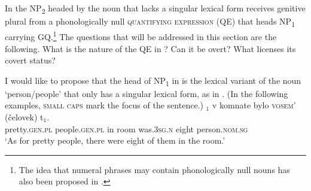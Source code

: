 \documentclass[output=paper,
modfonts,
newtxmath,
hidelinks
]{langscibook}
\begin{document}
\z


\noindent In  the NP\textsubscript{2} headed by the noun that lacks a singular lexical form receives genitive plural from a phonologically null \textsc{quantifying expression} (QE) that heads NP\textsubscript{1} carrying GQ.\footnote{\label{fn10}The idea that numeral phrases may contain phonologically null nouns has also been proposed in \citet{Kayne2005}.}
The questions that will be addressed in this section are the following. What is the nature of the QE in ? Can it be overt? What licenses its covert status?  

I would like to propose that the head of NP\textsubscript{1} in  is the lexical variant of the noun ‘person/people’ that only has a singular lexical form, as in . (In the following examples, \textsc{small caps} mark the focus of the sentence.)
\ea \label{ex15}
	$_1$ v  komnate  bylo   \textsc{vosem’} {(čelovek)  \hspace{1cm}t$_1$}.\\
 	{} pretty.\textsc{gen.pl} people.\textsc{gen.pl} in room was.\textsc{3sg.n} eight  \hspace{2pt}person.\textsc{nom.sg}\\
	\glt `As for pretty people, there were eight of them in the room.'
\z
\end{document}
